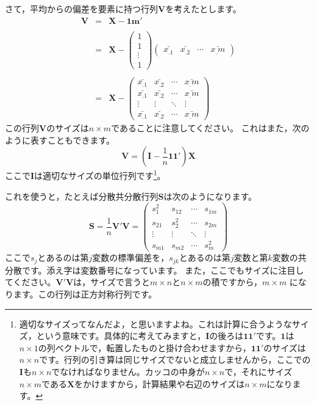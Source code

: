 \documentclass{ltjsbook}
\begin{document}
さて，平均からの偏差を要素に持つ行列$\bm{V}$を考えたとします。
\[
	\begin{array}{ccl}
		\bm{V} & = & \bm{X} - \bm{1} \bm{m}'                                                                                                                  \\
		       &   &                                                                                                                                          \\
		       & = & \bm{X} - \begin{pmatrix} 1 \\ 1 \\ \vdots \\ 1 \end{pmatrix} \begin{pmatrix} \bar{x_.1} & \bar{x_.2} & \cdots & \bar{x_.m} \end{pmatrix} \\
		       &   &                                                                                                                                          \\
		       & = & \bm{X} - \begin{pmatrix} \bar{x_.1} & \bar{x_.2} & \cdots & \bar{x_.m} \\
                \bar{x_.1} & \bar{x_.2} & \cdots & \bar{x_.m} \\
                \vdots     & \vdots     & \ddots & \vdots     \\
                \bar{x_.1} & \bar{x_.2} & \cdots & \bar{x_.m}\end{pmatrix}
	\end{array}
\]
この行列$\bm{V}$のサイズは$n \times m$であることに注意してください。
これはまた，次のように表すこともできます。
\[ \bm{V} = ( \bm{I} -\frac{1}{n}\bm{1} \bm{1} ')\bm{X} \]
ここで$\bm{I}$は適切なサイズの単位行列です\footnote{適切なサイズってなんだよ，と思いますよね。これは計算に合うようなサイズ，という意味です。具体的に考えてみますと，$\bm{I}$の後ろは$\bm{1}\bm{1}'$です。$\bm{1}$は$n\times 1$の列ベクトルで，転置したものと掛け合わせますから，$\bm{1}\bm{1}'$のサイズは$n \times n$です。行列の引き算は同じサイズでないと成立しませんから，ここでの$\bm{I}$も$n \times n$でなければなりません。カッコの中身が$n \times n$で，それにサイズ$n \times m$である$\bm{X}$をかけますから，計算結果や右辺のサイズは$n \times m$になります。}。

これを使うと，たとえば分散共分散行列$\bm{S}$は次のようになります。
\[ \bm{S} = \frac{1}{n} \bm{V}' \bm{V} = \begin{pmatrix}
		s_1^2  & s_{12} & \cdots & s_{1m} \\
		s_{21} & s_2^2  & \cdots & s_{2m} \\
		\vdots & \vdots & \ddots & \vdots \\
		s_{m1} & s_{m2} & \cdots & s_m^2\end{pmatrix} \]
ここで$s_j$とあるのは第$j$変数の標準偏差を，$s_{jk}$とあるのは第$j$変数と第$k$変数の共分散です。添え字は変数番号になっています。
また，ここでもサイズに注目してください。$\bm{V}'\bm{V}$は，サイズで言うと$m \times n$と$n \times m$の積ですから，$m \times m$ になります。この行列は正方対称行列です。
\end{document}
